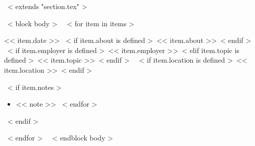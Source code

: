 ~< extends "section.tex" >~

~< block body >~
  ~< for item in items >~
    \begin{samepage}
      \cventry
        {<< item.date >>}
        {~< if item.about is defined >~<< item.about >>~< endif >~}
        {~< if item.employer is defined >~<< item.employer >>~< elif item.topic is defined >~<< item.topic >>~< endif >~}
        {~< if item.location is defined >~<< item.location >>~< endif >~}
        {}
        { %
          ~< if item.notes >~
            \begin{itemize}
              ~< for note in item.notes >~
                \item{<< note >>}
              ~< endfor >~
            \end{itemize}
          ~< endif >~
        }
    \end{samepage}
    \vspace{10pt}
  ~< endfor >~
  \vspace{-10pt}
~< endblock body >~

